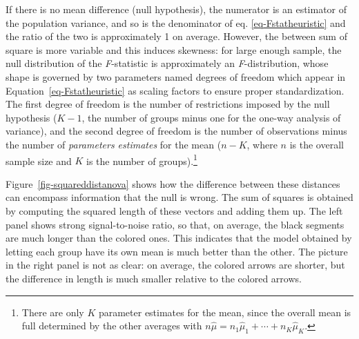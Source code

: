 \documentclass[
  11pt,
  letterpaper,
]{scrbook}
\theoremstyle{definition}
\theoremstyle{definition}
\theoremstyle{remark}
\begin{document}
If there is no mean difference (null hypothesis), the numerator is an
estimator of the population variance, and so is the denominator of eq.
\ref{eq-Fstatheuristic} and the ratio of the two is approximately 1 on
average. However, the between sum of square is more variable and this
induces skewness: for large enough sample, the null distribution of the
\emph{F}-statistic is approximately an \emph{F}-distribution, whose
shape is governed by two parameters named degrees of freedom which
appear in Equation~\ref{eq-Fstatheuristic} as scaling factors to ensure
proper standardization. The first degree of freedom is the number of
restrictions imposed by the null hypothesis (\(K-1\), the number of
groups minus one for the one-way analysis of variance), and the second
degree of freedom is the number of observations minus the number of
\emph{parameters estimates} for the mean (\(n-K\), where \(n\) is the
overall sample size and \(K\) is the number of groups).\footnote{There
  are only \(K\) parameter estimates for the mean, since the overall
  mean is full determined by the other averages with
  \(n\widehat{\mu} =n_1\widehat{\mu}_1 + \cdots + n_K \widehat{\mu}_K\).}

Figure~\ref{fig-squareddistanova} shows how the difference between these
distances can encompass information that the null is wrong. The sum of
squares is obtained by computing the squared length of these vectors and
adding them up. The left panel shows strong signal-to-noise ratio, so
that, on average, the black segments are much longer than the colored
ones. This indicates that the model obtained by letting each group have
its own mean is much better than the other. The picture in the right
panel is not as clear: on average, the colored arrows are shorter, but
the difference in length is much smaller relative to the colored arrows.
\end{document}
